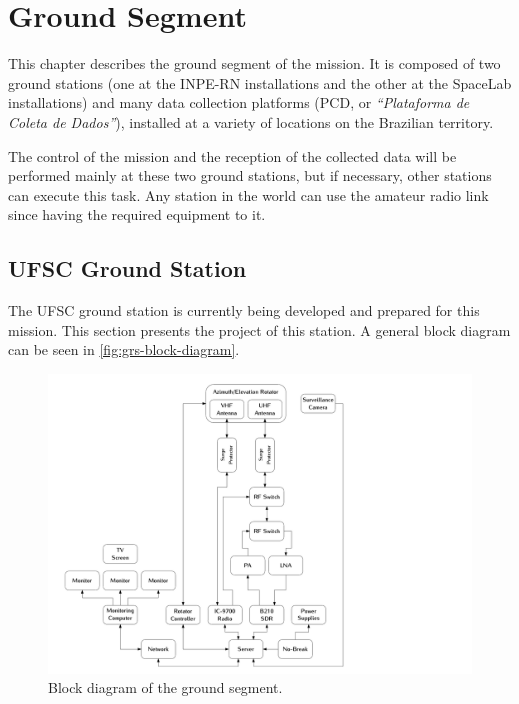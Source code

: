 %
%
%
%
%

%
%
%
%
%

\chapter{Ground Segment} \label{ch:ground-segment}

This chapter describes the ground segment of the mission. It is composed of two ground stations (one at the INPE-RN installations and the other at the SpaceLab installations) and many data collection platforms (PCD, or \textit{``Plataforma de Coleta de Dados''}), installed at a variety of locations on the Brazilian territory.

The control of the mission and the reception of the collected data will be performed mainly at these two ground stations, but if necessary, other stations can execute this task. Any station in the world can use the amateur radio link since having the required equipment to it.

\section{UFSC Ground Station}

The UFSC ground station is currently being developed and prepared for this mission. This section presents the project of this station. A general block diagram can be seen in \autoref{fig:grs-block-diagram}.

\begin{figure}[!ht]
    \begin{center}
        \includegraphics[width=\textwidth]{figures/grs-block-diagram.pdf}
        \caption{Block diagram of the ground segment.}
        \label{fig:grs-block-diagram}
    \end{center}
\end{figure}

